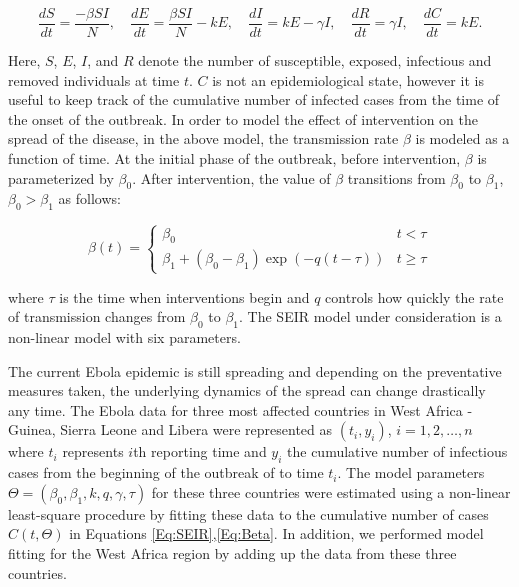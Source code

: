 \documentclass[10pt, journal,onecolumn]{IEEEtran}
\begin{document}
\begin{equation}
\dfrac{dS}{dt}	=	\dfrac{-\beta SI}{N},
\quad
\dfrac{dE}{dt}	=	\dfrac{\beta SI}{N}-kE,
\quad
\dfrac{dI}{dt}	=	kE-\gamma I,
\quad
\dfrac{dR}{dt}	=	\gamma I,
\quad
\dfrac{dC}{dt}	=	kE.
\label{Eq:SEIR}
\end{equation}

Here, $S$, $E$, $I$, and $R$ denote the number of susceptible, exposed, infectious and removed
individuals at time $t$. $C$ is not an epidemiological state, however it is useful to keep track of
the cumulative number of infected cases from the time of the onset of the outbreak. In order to
model the effect of intervention on the spread of the disease, in the above model, the transmission
rate $\beta$ is modeled as a function of time. At the initial phase of the outbreak, before
intervention, $\beta$ is parameterized by $\beta_0$. After intervention, the value of $\beta$
transitions from $\beta_0$ to $\beta_1$, $\beta_0>\beta_1$ as follows:

\begin{equation}
\beta(t)=\begin{cases}
\beta_{0} & t<\tau\\
\beta_{1}+(\beta_{0}-\beta_{1})\exp\left(-q\left(t-\tau\right)\right) & t\ge\tau
\end{cases}
\label{Eq:Beta}
\end{equation}

\noindent where $\tau$ is the time when interventions begin and $q$ controls how quickly the rate of
transmission changes from $\beta_0$ to $\beta_1$. The SEIR model under consideration is a non-linear
model with six parameters.

The current Ebola epidemic is still spreading and depending on the preventative measures  taken, the
underlying dynamics of the spread can change drastically any time. The Ebola data for three most
affected countries in West Africa - Guinea, Sierra Leone and Libera were represented as $(t_i,y_i)$,
$i=1,2,\ldots,n$ where $t_i$ represents $i$th reporting time and $y_i$ the cumulative number of
infectious cases from the beginning of the outbreak of to time $t_i$.  The model parameters
$\Theta=(\beta_0,\beta_1,k,q,\gamma, \tau)$ for these three countries were estimated using a
non-linear least-square procedure by fitting these data to the cumulative number of cases
$C(t,\Theta)$ in Equations \eqref{Eq:SEIR},\eqref{Eq:Beta}. In addition, we performed model fitting
for the West Africa region by adding up the data from these three countries.
\end{document}
